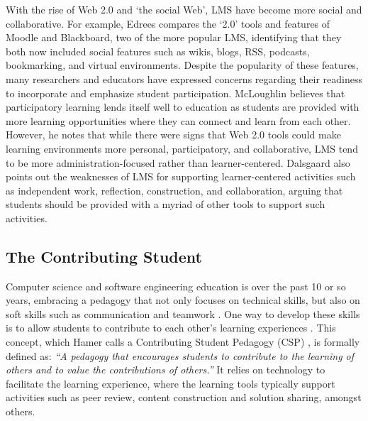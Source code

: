 With the rise of Web 2.0 and `the social Web', LMS have become more social and collaborative. For example, Edrees\cite{edrees2013elearning} compares the `2.0' tools and features of Moodle and Blackboard, two of the more popular LMS, identifying that they both now included social features such as wikis, blogs, RSS, podcasts, bookmarking, and virtual environments. Despite the popularity of these features, many researchers and educators have expressed concerns regarding their readiness to incorporate and emphasize student participation. McLoughlin \cite{mcloughlin2007social} believes that participatory learning lends itself well to education as students are provided with more learning opportunities where they can connect and learn from each other. However, he notes that while there were signs that Web 2.0 tools could make learning environments more personal, participatory, and collaborative, LMS tend to be more administration-focused rather than learner-centered. Dalsgaard \cite{dalsgaard2006social} also points out the weaknesses of LMS for supporting learner-centered activities such as independent work, reflection, construction, and collaboration, arguing that students should be provided with a myriad of other tools to support such activities.


\subsection{The Contributing Student}
Computer science and software engineering education is over the past 10 or so years, embracing a pedagogy that not only focuses on technical skills, but also on soft skills such as communication and teamwork \cite{jazayeri2004education}. One way to develop these skills is to allow students to contribute to each other's learning experiences \cite{hamer2006some}. This concept, which Hamer calls a Contributing Student Pedagogy (CSP) \cite{hamer2008contributing}, is formally defined as: \textit{``A pedagogy that encourages students to contribute to the learning of others and to value the contributions of others.''} It relies on technology to facilitate the learning experience, where the learning tools typically support activities such as peer review, content construction and solution sharing, amongst others.

